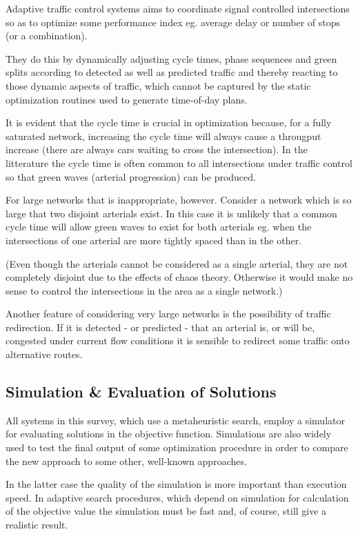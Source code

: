 \label{adaptive_cooperation}
Adaptive traffic control systems aims to coordinate signal controlled intersections so as to optimize some performance index eg. average delay or number of stops (or a combination).

They do this by dynamically adjusting cycle times, phase sequences and green splits according to detected as well as predicted traffic and thereby reacting to those dynamic aspects of traffic, which cannot be captured by the static optimization routines used to generate time-of-day plans.

It is evident that the cycle time is crucial in optimization because, for a fully saturated network, increasing the cycle time will always cause a througput increase (there are always cars waiting to cross the intersection). In the litterature the cycle time is often common to all intersections under traffic control so that green waves (arterial progression) can be produced. 

For large networks that is inappropriate, however. Consider a network which is so large that two disjoint arterials exist. In this case it is unlikely that a common cycle time will allow green waves to exist for both arterials eg. when the intersections of one arterial are more tightly spaced than in the other.

(Even though the arterials cannot be considered as a single arterial, they are not completely disjoint due to the effects of chaos theory. Otherwise it would make no sense to control the intersections in the area as  a single network.)

Another feature of considering very large networks is the possibility of traffic redirection. If it is detected - or predicted - that an arterial is, or will be, congested under current flow conditions it is sensible to redirect some traffic onto alternative routes. 

\subsection{Simulation \& Evaluation of Solutions}
\label{evaluation}
All systems in this survey, which use a metaheuristic search, employ a simulator for evaluating solutions in the objective function. Simulations are also widely used to test the final output of some optimization procedure in order to compare the new approach to some other, well-known approaches. 

In the latter case the quality of the simulation is more important than execution speed. In adaptive search procedures, which depend on simulation for calculation of the objective value the simulation must be fast and, of course, still give a realistic result. 

